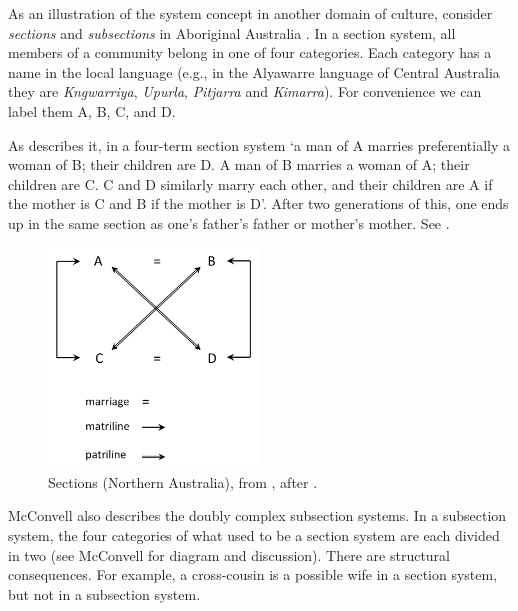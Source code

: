 \newpage
As an illustration of the system concept in another domain of culture, consider \textit{sections} 
and \textit{subsections} in Aboriginal Australia \citep{radcliffe-brown_social_1931}. In a 
section system, all members of a community belong in one of four 
categories. Each category has a name in the local language (e.g., in the 
Alyawarre language of Central Australia they are \textit{Kngwarriya}, 
\textit{Upurla}, \textit{Pitjarra} and \textit{Kimarra}). For convenience we can label them A, B, C, and D. 



As \citet[2]{mcconvell_origin_1985} describes it, in a four-term section system \textquoteleft a man 
of A marries preferentially a woman of B; their children are D. A man of 
B marries a woman of A; their children are C. C and D similarly marry 
each other, and their children are A if the mother is C and B if the 
mother is D'. After two generations of this, one ends up in the same 
section as one's father's father or mother's mother. See .

\begin{figure}[h]
\includegraphics[width=0.5\textwidth,keepaspectratio]{figures/Fig05}
\caption{Sections (Northern Australia), from \citet[32]{mcconvell_origin_1985}, after 
\citet{radcliffe-brown_social_1931}. }
\label{sections}
\end{figure}







McConvell also describes the doubly complex subsection systems. In a subsection system, the four categories of what used to be a section system are each divided in 
two (see McConvell for diagram and discussion). There are structural 
consequences. For example, a cross-cousin is a possible wife in a 
section system, but not in a subsection system. 



